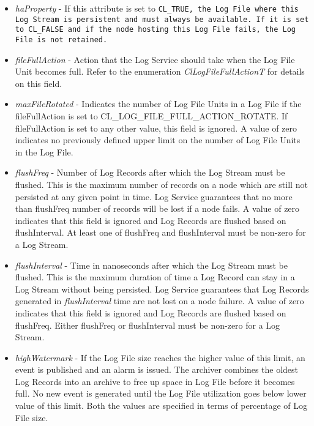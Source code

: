 \begin{flushleft}
\begin{itemize}
\item
\textit{haProperty} - If this attribute is set to \tt{CL\_\-TRUE}, the Log File where this Log Stream is persistent and must always be available. 
If it is set to \tt{CL\_\-FALSE} and if the node hosting this Log File fails, the Log File is not retained.
\item
\textit{fileFullAction} - Action that the Log Service should take when the Log File Unit becomes full. Refer to the enumeration 
\textit{ClLogFileFullActionT} for details on this field.
\item
\textit{maxFileRotated} - Indicates the number of Log File Units in a Log File if the fileFullAction is set to 
CL\_\-LOG\_\-FILE\_\-FULL\_\-ACTION\_\-ROTATE. If fileFullAction is set to any other value, this field is ignored. 
A value of zero indicates no previously defined upper limit on the number of Log File Units in the Log File.
\item
\textit{flushFreq} - Number of Log Records after which the Log Stream must be flushed. This is the maximum number of records on a node which are still
not persisted at any given point in time. Log Service guarantees that no more than flushFreq number of records will be lost if a node fails. A value of 
zero indicates that this field is ignored and Log Records are flushed based on flushInterval. At least one of flushFreq and flushInterval must be 
non-zero for a Log Stream.
\item
\textit{flushInterval} - Time in nanoseconds after which the Log Stream must be flushed. This is the maximum duration of time a Log Record can stay 
in a Log Stream without being persisted. Log Service guarantees that Log Records generated in \textit{flushInterval} time are not lost on a node failure. 
A value of zero indicates that this field is ignored and Log Records are flushed based on flushFreq. 
Either flushFreq or flushInterval must be non-zero for a Log Stream.
\item
\textit{highWatermark} - If the Log File size reaches the higher value of this limit, an event is published and an alarm is issued. The archiver 
combines the oldest Log Records into an archive to free up space in Log File before it becomes full. No new event is generated until the 
Log File utilization goes below lower value of this limit. Both the values are specified in terms of percentage of Log File size.





\end{itemize}
\end{flushleft}
